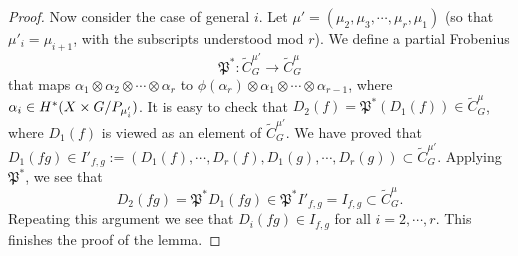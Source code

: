 \documentclass[10pt,a4paper]{amsart}
\newcommand\frP{\mathfrak{P}}
\newcommand\ot{\otimes}
\newcommand{\cohog}[2]{\textup{H}^{#1}({#2})}     %
\newcommand{\wt}[1]{\widetilde{#1}}
\renewcommand\a\alpha
\begin{document}
\begin{proof}
    Now consider the case of general $i$. Let $\mu'=(\mu_2,\mu_3,\cdots, \mu_r,\mu_1)$ (so that $\mu'_i=\mu_{i+1}$, with the subscripts understood mod $r$). We define a partial Frobenius
    \begin{equation}\label{partial Frob on C}
        \frP^*: \wt C^{\mu'}_G\to \wt C^{\mu}_G
    \end{equation}
    that maps $\a_1\ot\a_2\ot\cdots\ot \a_r$ to $\phi(\a_r)\ot\a_1\ot\cdots\ot \a_{r-1}$, where $\a_i\in \cohog{*}{X\times G/P_{\mu'_{i}}}$. It is easy to check that $D_2(f)=\frP^*(D_1(f))\in \wt C^\mu_G$, where $D_1(f)$ is viewed as an element of $\wt C^{\mu'}_G$. We have proved that $D_1(fg)\in I'_{f,g}:=(D_1(f),\cdots, D_r(f), D_1(g),\cdots, D_r(g))\subset \wt C^{\mu'}_G$. Applying $\frP^*$, we see that
    \begin{equation*}
        D_2(fg)=\frP^*D_1(fg)\in \frP^* I'_{f,g}=I_{f,g}\subset \wt C^\mu_G.
    \end{equation*}
    Repeating this argument we see that $D_i(fg)\in I_{f,g}$ for all $i=2,\cdots, r$. This finishes the proof of the lemma.
\end{proof}
\end{document}
